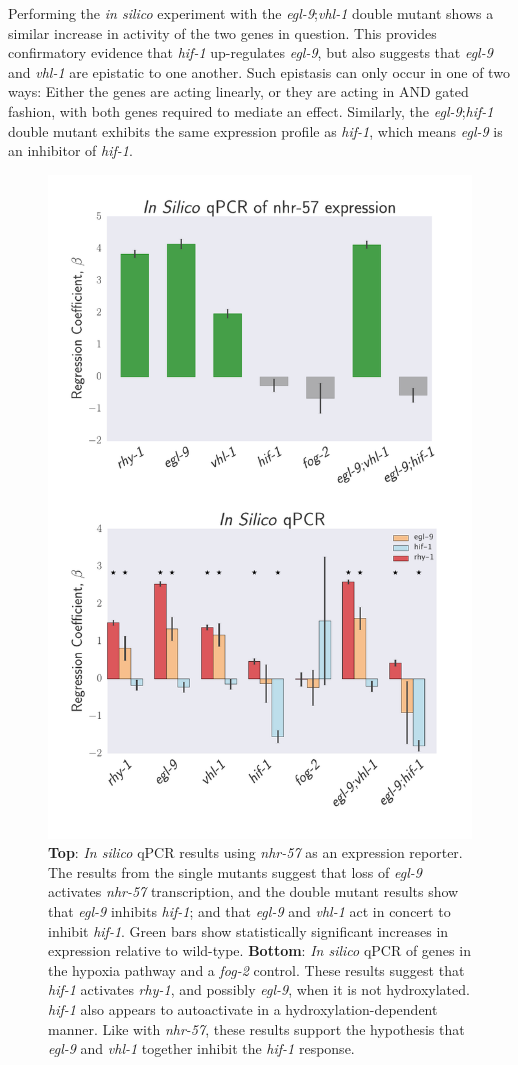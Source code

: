 \documentclass[9pt,twocolumn,twoside]{pnas-new}
\newcommand{\egl}{\emph{egl-9}}
\newcommand{\rhy}{\emph{rhy-1}}
\newcommand{\vhl}{\emph{vhl-1}}
\newcommand{\hif}{\emph{hif-1}}
\newcommand{\fog}{\emph{fog-2}}
\newcommand{\nhr}{\emph{nhr-57}}
\begin{document}
Performing the \emph{in silico} experiment with the \egl{};\vhl{} double mutant shows a similar increase in activity of the two genes in question.
This provides confirmatory evidence that \hif{} up-regulates \egl{}, but also suggests that \egl{} and \vhl{} are epistatic to one another. Such epistasis can only occur in one of two ways: Either the genes are acting linearly, or they are acting in AND gated fashion, with both genes required to mediate an effect. Similarly, the \egl{};\hif{} double mutant exhibits the same expression profile as \hif{}, which means \egl{} is an inhibitor of \hif{}.
\begin{figure}[tbhp]
\centering
\includegraphics[width=.72\linewidth]{figs/insilico_qpcr.pdf}
\caption{\textbf{Top}: \emph{In silico} qPCR results using \nhr{} as an expression reporter. The results from the single mutants suggest that loss of \egl{} activates \nhr{} transcription, and the double mutant results show that \egl{} inhibits \hif{}; and that \egl{} and \vhl{} act in concert to inhibit \hif{}. Green bars show statistically significant increases in expression relative to wild-type. \textbf{Bottom}: \emph{In silico} qPCR of genes in the hypoxia pathway and a \fog{} control. These results suggest that \hif{} activates \rhy{}, and possibly \egl{}, when it is not hydroxylated. \hif{} also appears to autoactivate in a hydroxylation-dependent manner. Like with \nhr{}, these results support the hypothesis that \egl{} and \vhl{} together inhibit the \hif{} response.}
\label{fig:qpcr}
\end{figure}
\end{document}
